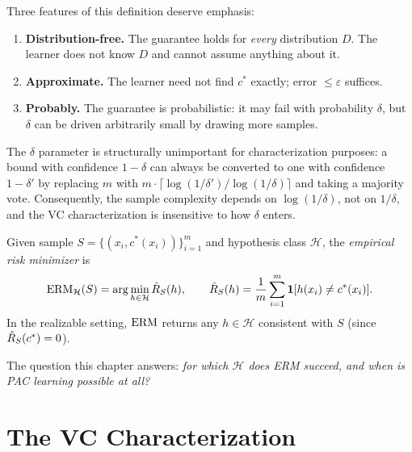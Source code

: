 Three features of this definition deserve emphasis:

\begin{enumerate}[leftmargin=*,itemsep=3pt]
\item \textbf{Distribution-free.}  The guarantee holds for \emph{every}
  distribution $D$.  The learner does not know $D$ and cannot assume anything
  about it.
\item \textbf{Approximate.}  The learner need not find $c^*$ exactly; error
  $\leq \varepsilon$ suffices.
\item \textbf{Probably.}  The guarantee is probabilistic: it may fail with
  probability $\delta$, but $\delta$ can be driven arbitrarily small by
  drawing more samples.
\end{enumerate}

\begin{remark}
\label{rmk:delta}
The $\delta$ parameter is structurally unimportant for characterization
purposes: a bound with confidence $1 - \delta$ can always be converted to one
with confidence $1 - \delta'$ by replacing $m$ with $m \cdot
\lceil\log(1/\delta')/\log(1/\delta)\rceil$ and taking a majority vote.
Consequently, the sample complexity depends on $\log(1/\delta)$, not on
$1/\delta$, and the VC characterization is insensitive to how $\delta$ enters.
\end{remark}

\begin{defn}
\label{def:erm}
  \leanok
Given sample $S = \{(x_i, c^*(x_i))\}_{i=1}^m$ and hypothesis class
$\mathcal{H}$, the \emph{empirical risk minimizer} is
\[
  \operatorname{ERM}_\mathcal{H}(S) = \arg\min_{h \in \mathcal{H}} \hat{R}_S(h),
  \qquad
  \hat{R}_S(h) = \frac{1}{m}\sum_{i=1}^m \mathbf{1}[h(x_i) \neq c^*(x_i)].
\]
In the realizable setting, $\operatorname{ERM}$ returns any $h \in \mathcal{H}$ consistent
with $S$ (since $\hat{R}_S(c^*) = 0$).
\end{defn}

The question this chapter answers: \emph{for which $\mathcal{H}$ does ERM
succeed, and when is PAC learning possible at all?}



\section{The VC Characterization}
\label{sec:vc-char}

